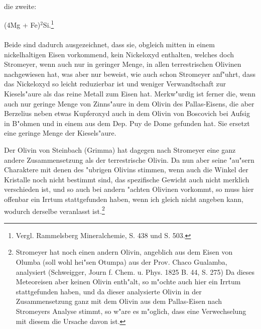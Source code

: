 \documentclass[a4paper, 11pt, oneside]{article}
\begin{document}
\paragraph{}
die zweite:
\begin{center}
(4Mg + Fe)$^{2}$Si.\footnote{Vergl. Rammelsberg Mineralchemie, S. 438 und S. 503.}
\end{center}
\paragraph{}
Beide sind dadurch ausgezeichnet, dass sie, obgleich mitten in einem nickelhaltigen Eisen vorkommend, kein Nickeloxyd enthalten, welches doch Stromeyer, wenn auch nur in geringer Menge, in allen terrestrischen Olivinen nachgewiesen hat, was aber nur beweist, wie auch schon Stromeyer anf"uhrt, dass das Nickeloxyd so leicht reduzierbar ist und weniger Verwandtschaft zur Kiesels"aure als das reine Metall zum Eisen hat. Merkw"urdig ist ferner die, wenn auch nur geringe Menge von Zinns"aure in dem Olivin des Pallas-Eisens, die aber Berzelius neben etwas Kupferoxyd auch in dem Olivin von Boscovich bei Aufsig in B"ohmen und in einem aus dem Dep. Puy de Dome gefunden hat. Sie ersetzt eine geringe Menge der Kiesels"aure.

Der Olivin von Steinbach (Grimma) hat dagegen nach Stromeyer eine ganz andere Zusammensetzung als der terrestrische Olivin. Da nun aber seine "au"sern Charaktere mit denen des "ubrigen Olivins stimmen, wenn auch die Winkel der Kristalle noch nicht bestimmt sind, das spezifische Gewicht auch nicht merklich verschieden ist, und so auch bei andern "achten Olivinen vorkommt, so muss hier offenbar ein Irrtum stattgefunden haben, wenn ich gleich nicht angeben kann, wodurch derselbe veranlasst ist.\footnote{Stromeyer hat noch einen andern Olivin, angeblich aus dem Eisen von Olumba (soll wohl hei"sen Otumpa) aus der Prov. Chaco Gualamba, analysiert (Schweigger, Journ f. Chem. u. Phys. 1825 B. 44, S. 275) Da dieses Meteoreisen aber keinen Olivin enth"alt, so m"ochte auch hier ein Irrtum stattgefunden haben, und da dieser analysierte Olivin in der Zusammensetzung ganz mit dem Olivin aus dem Pallas-Eisen nach Stromeyers Analyse stimmt, so w"are es m"oglich, dass eine Verwechselung mit diesem die Ursache davon ist.}
\end{document}
